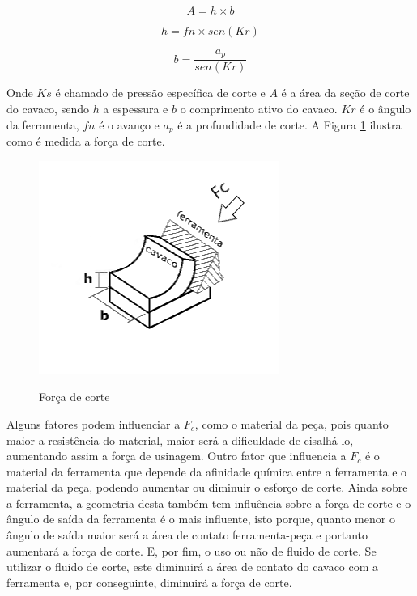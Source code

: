 \documentclass[deposito, acronym, symbols]{fei}
\begin{document}
\begin{equation}  
    A=h\times{b}
    \label{eq: Área da seção de corte}
\end{equation}

\begin{equation}
    h=fn\times{sen(Kr)}
    \label{eq: Fórmula do h}
\end{equation}

\begin{equation}
    b=\frac{a_p}{sen(Kr)}
    \label{eq: Fórmula do h_2}
\end{equation}



Onde $Ks$ é chamado de pressão específica de corte e $A$ é a área da seção de corte do cavaco, sendo $h$ a espessura e $b$ o comprimento ativo do cavaco. $Kr$ é o ângulo da ferramenta, $fn$ é o avanço e $a_p$ é a profundidade de corte. A Figura \ref{fig: Força de corte} ilustra como é medida a força de corte.

\begin{figure}[!htb]
 \centering
    \caption{Força de corte}
    \includegraphics[width=0.5\linewidth]{Imagens/força de corte 1.png}
    \label{fig: Força de corte}
 \end{figure}

 
Alguns fatores podem influenciar a $F_c$, como o material da peça, pois quanto maior a resistência do material, maior será a dificuldade de cisalhá-lo, aumentando assim a força de usinagem. Outro fator que influencia a $F_c$ é o material da ferramenta que depende da afinidade química entre a ferramenta e o material da peça, podendo aumentar ou diminuir o esforço de corte. Ainda sobre a ferramenta, a geometria desta também tem influência sobre a força de corte e o ângulo de saída da ferramenta é o mais influente, isto porque, quanto menor o ângulo de saída maior será a área de contato ferramenta-peça e portanto aumentará a força de corte. E, por fim, o uso ou não de fluido de corte. Se utilizar o fluido de corte, este diminuirá a área de contato do cavaco com a ferramenta e, por conseguinte, diminuirá a força de corte.
\end{document}
